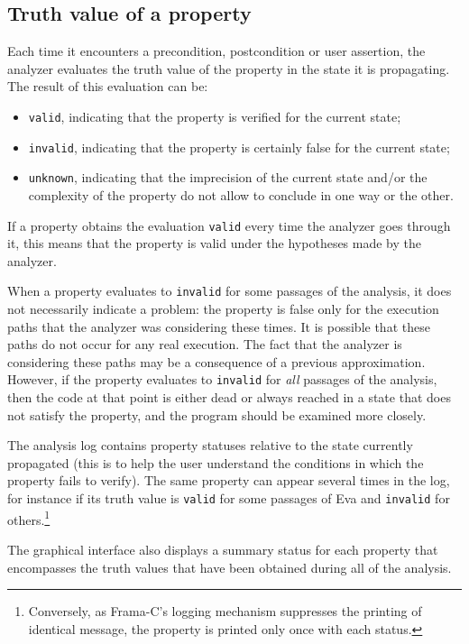 \documentclass[web]{frama-c-book}
\newcommand{\Eva}{\textsf{Eva}}
\begin{document}
\subsection{Truth value of a property}

Each time it encounters a precondition, postcondition or user assertion, 
the analyzer evaluates the truth value of the property
in the state it is propagating. The result of this evaluation can be:
\begin{itemize}
\item \lstinline|valid|, indicating that the property is verified for the
  current state;
\item \lstinline|invalid|, indicating that the property is certainly false
  for the current state;
\item \lstinline|unknown|, indicating that the imprecision of the current state
and/or the complexity of the property do not allow to conclude in one way or the
other.
\end{itemize}

If a property obtains the evaluation \lstinline|valid| every time the
analyzer goes through it, this means that the property is valid under
the hypotheses made by the analyzer.

When a property evaluates to \lstinline|invalid| for some passages of
the analysis, it does not necessarily indicate a problem: the property
is false only for the execution paths that the analyzer was
considering these times. It is possible that these paths do not
occur for any real execution. The fact that the analyzer is
considering these paths may be a consequence of a previous
approximation. However, if the property evaluates to
\lstinline|invalid| for {\em all} passages of the analysis, then the
code at that point is either dead or always reached in a state that
does not satisfy the property, and the program should be examined more
closely.

The analysis log contains property statuses relative to the state
currently propagated (this is to help the user understand the
conditions in which the property fails to verify). The same property
can appear several times in the log, for instance if its truth value is
\lstinline|valid| for some passages of \Eva{} and
\lstinline|invalid| for others.\footnote{Conversely, as Frama-C's
logging mechanism suppresses the printing of identical message,
the property is printed only once with each status.}


The graphical interface also displays a summary status for each
property that encompasses the truth values that have been obtained
during all of the analysis.
\end{document}

